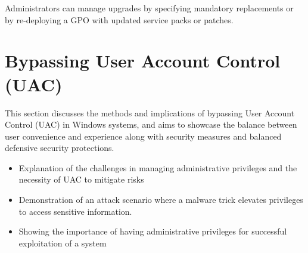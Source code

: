 Administrators can manage upgrades by specifying mandatory replacements or by re-deploying a GPO with updated service packs or patches.
\chapter{Bypassing User Account Control (UAC)}
This section discusses the methods and implications of bypassing User Account Control (UAC) in Windows systems, and aims to showcase the balance between user convenience and experience along with security measures and balanced defensive security protections.
\begin{itemize}
    \item Explanation of the challenges in managing administrative privileges and the necessity of UAC to mitigate risks
    \item Demonstration of an attack scenario where a malware trick elevates privileges to access sensitive information.
    \item Showing the importance of having administrative privileges for successful exploitation of a system
\end{itemize}

